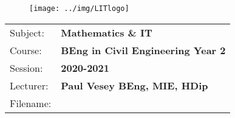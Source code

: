 \documentclass[a4paper, 10pt]{article}
\begin{document}
\lstset{language=HTML,
				basicstyle=\small,
				breaklines=true,
        numbers=left,
        numberstyle=\tiny,
        showstringspaces=false,
        aboveskip=-20pt,
        frame=leftline
        }
				
\begin{figure}
	\centering
	\texttt{[image: ../img/LITlogo]}
\end{figure}


\begin{tabularx}{\textwidth}{ |l|X| }
	\hline
	
	Subject: & \textbf{Mathematics \& IT}\\
	Course: & \textbf{BEng in Civil Engineering Year 2}\\
	Session: & \textbf{2020-2021}\\
	Lecturer: & \textbf{Paul Vesey \footnotesize{BEng, MIE, HDip}}\\
	Filename: & \textbf{\currfilebase}\\
	\hline
\end{tabularx}



\vspace{0.25cm}	
\end{document}
